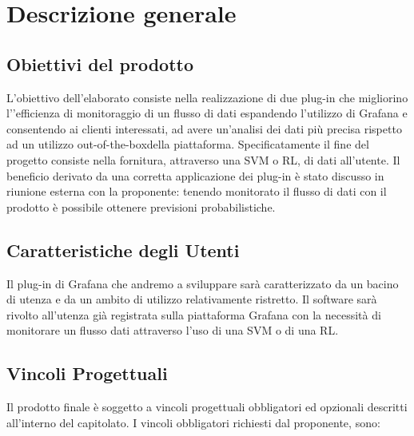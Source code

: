 \section{Descrizione generale}
   
	\subsection{Obiettivi del prodotto}
	L’obiettivo dell’elaborato consiste nella realizzazione di due plug-in che migliorino l’’efficienza di monitoraggio di un flusso di dati espandendo l’utilizzo di Grafana e consentendo ai clienti  interessati, ad avere un’analisi dei dati più precisa rispetto ad un utilizzo out-of-the-box\glo della piattaforma. Specificatamente il  fine del progetto consiste nella fornitura, attraverso una SVM o RL, di dati all’utente. Il beneficio derivato da una corretta applicazione dei plug-in è stato discusso in riunione esterna con la proponente: tenendo monitorato il flusso di dati con il prodotto è possibile ottenere previsioni probabilistiche. 
	\subsection{Caratteristiche degli Utenti}
	Il plug-in di Grafana che andremo a sviluppare sarà caratterizzato da un bacino di utenza e da un ambito di utilizzo relativamente ristretto.
Il software sarà rivolto all’utenza già registrata sulla piattaforma Grafana con la necessità di monitorare un flusso dati attraverso l’uso di una SVM o di una RL.

	 \subsection{Vincoli Progettuali}
	 Il prodotto finale è soggetto a vincoli progettuali obbligatori ed opzionali descritti all’interno del capitolato\glo. I vincoli obbligatori richiesti dal proponente, sono:

